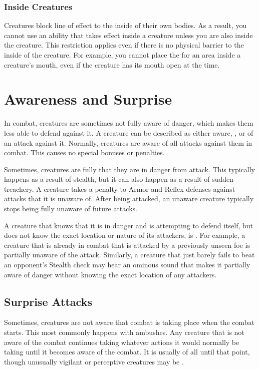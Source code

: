         \subsubsection{Inside Creatures}
            Creatures block line of effect to the inside of their own bodies.
            As a result, you cannot use an ability that takes effect inside a creature unless you are also inside the creature.
            This restriction applies even if there is no physical barrier to the inside of the creature.
            For example, you cannot place the  for an area inside a creature's mouth, even if the creature has its mouth open at the time.

\section{Awareness and Surprise}\label{Awareness and Surprise}
    In combat, creatures are sometimes not fully aware of danger, which makes them less able to defend against it.
    A creature can be described as either aware, \unaware, or \partiallyunaware of an attack against it.
    Normally, creatures are aware of all attacks against them in combat.
    This causes no special bonuses or penalties.

    Sometimes, creatures are fully \unaware that they are in danger from attack.
    This typically happens as a result of stealth, but it can also happen as a result of sudden treachery.
    A creature takes a  penalty to Armor and Reflex defenses against attacks that it is unaware of.
    After being attacked, an unaware creature typically stops being fully unaware of future attacks.

    A creature that knows that it is in danger and is attempting to defend itself, but does not know the exact location or nature of its attackers, is \partiallyunaware.
    For example, a creature that is already in combat that is attacked by a previously unseen foe is partially unaware of the attack.
    Similarly, a creature that just barely fails to beat an opponent's Stealth check may hear an ominous sound that makes it partially aware of danger without knowing the exact location of any attackers.

    \subsection{Surprise Attacks}\label{Surprise Attacks}
        Sometimes, creatures are not aware that combat is taking place when the combat starts.
        This most commonly happens with ambushes.
        Any creature that is not aware of the combat continues taking whatever actions it would normally be taking until it becomes aware of the combat.
        It is usually \unaware of all until that point, though unusually vigilant or perceptive creatures may be \partiallyunaware.

